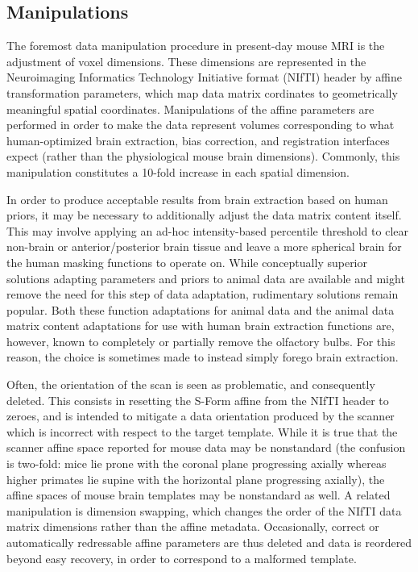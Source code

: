\subsection{Manipulations}
The foremost data manipulation procedure in present-day mouse MRI is the adjustment of voxel dimensions.
These dimensions are represented in the Neuroimaging Informatics Technology Initiative format (NIfTI) header \cite{nifti} by affine transformation parameters, which map data matrix cordinates to geometrically meaningful spatial coordinates.
Manipulations of the affine parameters are performed in order to make the data represent volumes corresponding to what human-optimized brain extraction, bias correction, and registration interfaces expect (rather than the physiological mouse brain dimensions).
Commonly, this manipulation constitutes a 10-fold increase in each spatial dimension.

In order to produce acceptable results from brain extraction based on human priors, it may be necessary to additionally adjust the data matrix content itself.
This may involve applying an ad-hoc intensity-based percentile threshold to clear non-brain or anterior/posterior brain tissue and leave a more spherical brain for the human masking functions to operate on.
While conceptually superior solutions adapting parameters and priors to animal data are available \cite{rbet,Oguz2014} and might remove the need for this step of data adaptation, rudimentary solutions remain popular.
Both these function adaptations for animal data and the animal data matrix content adaptations for use with human brain extraction functions are, however, known to completely or partially remove the olfactory bulbs.
For this reason, the choice is sometimes made to instead simply forego brain extraction.

Often, the orientation of the scan is seen as problematic, and consequently deleted.
This consists in resetting the S-Form affine from the NIfTI header to zeroes, and is intended to mitigate a data orientation produced by the scanner which is incorrect with respect to the target template.
While it is true that the scanner affine space reported for mouse data may be nonstandard (the confusion is two-fold: mice lie prone with the coronal plane progressing axially whereas higher primates lie supine with the horizontal plane progressing axially), the affine spaces of mouse brain templates may be nonstandard as well.
A related manipulation is dimension swapping, which changes the order of the NIfTI data matrix dimensions rather than the affine metadata.
Occasionally, correct or automatically redressable affine parameters are thus deleted and data is reordered beyond easy recovery, in order to correspond to a malformed template.

